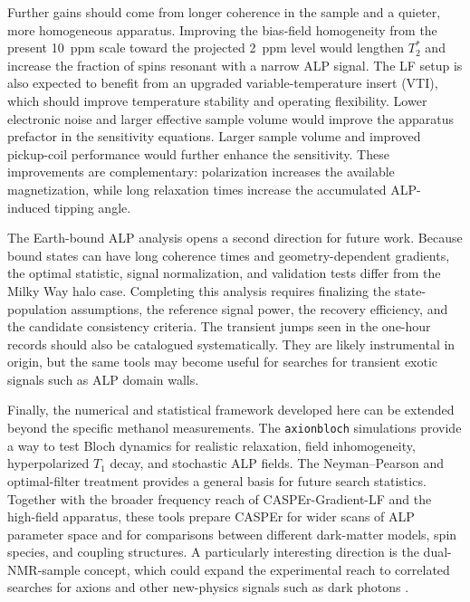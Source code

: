 Further gains should come from longer coherence in the sample and a quieter, more homogeneous apparatus.
Improving the bias-field homogeneity from the present \SI{10}{ppm} scale toward the projected \SI{2}{ppm} level would lengthen $T_2^*$ and increase the fraction of spins resonant with a narrow ALP signal.
The LF setup is also expected to benefit from an upgraded variable-temperature insert (VTI), which should improve temperature stability and operating flexibility.
Lower electronic noise and larger effective sample volume would improve the apparatus prefactor in the sensitivity equations.
Larger sample volume and improved pickup-coil performance would further enhance the sensitivity.
These improvements are complementary: polarization increases the available magnetization, while long relaxation times increase the accumulated ALP-induced tipping angle.

The Earth-bound ALP analysis opens a second direction for future work.
Because bound states can have long coherence times and geometry-dependent gradients, the optimal statistic, signal normalization, and validation tests differ from the Milky Way halo case.
Completing this analysis requires finalizing the state-population assumptions, the reference signal power, the recovery efficiency, and the candidate consistency criteria.
The transient jumps seen in the one-hour records should also be catalogued systematically.
They are likely instrumental in origin, but the same tools may become useful for searches for transient exotic signals such as ALP domain walls.

Finally, the numerical and statistical framework developed here can be extended beyond the specific methanol measurements.
The \texttt{axionbloch} simulations provide a way to test Bloch dynamics for realistic relaxation, field inhomogeneity, hyperpolarized $T_1$ decay, and stochastic ALP fields.
The Neyman--Pearson and optimal-filter treatment provides a general basis for future search statistics.
Together with the broader frequency reach of CASPEr-Gradient-LF and the high-field apparatus, these tools prepare CASPEr for wider scans of ALP parameter space and for comparisons between different dark-matter models, spin species, and coupling structures.
A particularly interesting direction is the dual-NMR-sample concept, which could expand the experimental reach to correlated searches for axions and other new-physics signals such as dark photons \cite{dror2025axionproductiondetectionusing}.
